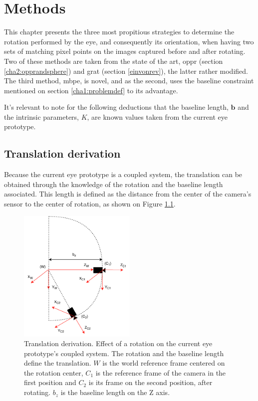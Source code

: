 
\chapter{Methods}
\label{methods}

This chapter presents the three most propitious strategies to determine the rotation performed by the eye, and consequently its orientation, when having two sets of matching pixel points on the images captured before and after rotating. Two of these methods are taken from the state of the art, \acrlong{oppr} (section \ref{cha2:opprandsphere}) and \acrlong{grat} (section \ref{einvonrev}), the latter rather modified. The third method, \acrfull{mbpe}, is novel, and as the second, uses the baseline constraint mentioned on section \ref{cha1:problemdef} to its advantage.

It's relevant to note for the following deductions that the baseline length, $\mathbf{b}$ and the intrinsic parameters, $K$, are known values taken from the current eye prototype.

\section{Translation derivation}

Because the current eye prototype is a coupled system, the translation can be obtained through the knowledge of the rotation and the baseline length associated. This length is defined as the distance from the center of the camera's sensor to the center of rotation, as shown on Figure \ref{cha3:detori:translation}.
\begin{figure}[ht]
	\centering
	\includegraphics[width=0.5\textwidth]{images/transf.pdf}
	\caption[Translation derivation]{Translation derivation. Effect of a rotation on the current eye prototype's coupled system. The rotation and the baseline length define the translation. ${W}$ is the world reference frame centered on the rotation center, ${C_1}$ is the reference frame of the camera in the first position and ${C_2}$ is its frame on the second position, after rotating. $b_z$ is the baseline length on the Z axis.}
	\label{cha3:detori:translation}
\end{figure}

